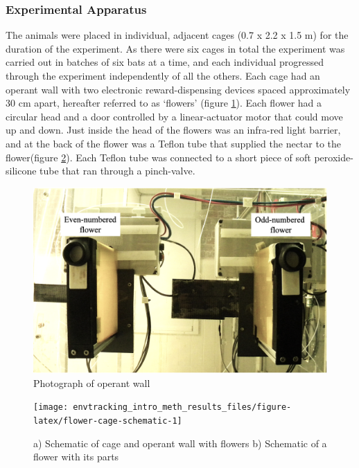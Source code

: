 \documentclass[
]{article}
\begin{document}
\hypertarget{experimental-apparatus}{%
\subsubsection{Experimental Apparatus}\label{experimental-apparatus}}

The animals were placed in individual, adjacent cages (0.7 x 2.2 x 1.5 m) for the duration of the experiment. As there were six cages in total the experiment was carried out in batches of six bats at a time, and each individual progressed through the experiment independently of all the others. Each cage had an operant wall with two electronic reward-dispensing devices spaced approximately 30 cm apart, hereafter referred to as `flowers' (figure \ref{fig:operant-wall}). Each flower had a circular head and a door controlled by a linear-actuator motor that could move up and down. Just inside the head of the flowers was an infra-red light barrier, and at the back of the flower was a Teflon tube that supplied the nectar to the flower(figure \ref{fig:flower-cage-schematic}). Each Teflon tube was connected to a short piece of soft peroxide-silicone tube that ran through a pinch-valve.



\begin{figure}[H]

{\centering \includegraphics[width=16in]{images/operant_wall} 

}

\caption{Photograph of operant wall}\label{fig:operant-wall}
\end{figure}



\begin{figure}[H]

{\centering \texttt{[image: envtracking\_intro\_meth\_results\_files/figure-latex/flower-cage-schematic-1]} 

}

\caption{a) Schematic of cage and operant wall with flowers b) Schematic of a flower with its parts}\label{fig:flower-cage-schematic}
\end{figure}
\end{document}
